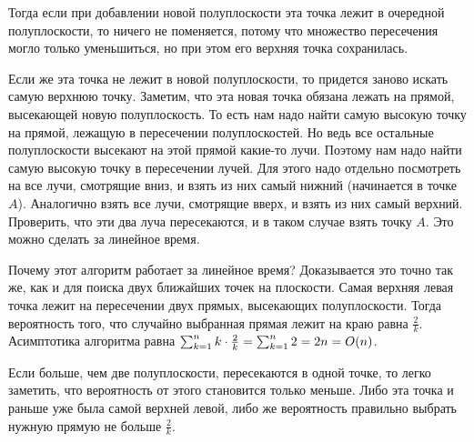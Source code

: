 Тогда если при добавлении новой полуплоскости эта точка лежит в очередной полуплоскости, то ничего не поменяется, потому что множество пересечения могло только уменьшиться, но при этом его верхняя точка сохранилась.

Если же эта точка не лежит в новой полуплоскости, то придется заново искать самую верхнюю точку. Заметим, что эта новая точка обязана лежать на прямой, высекающей новую полуплоскость. То есть нам надо найти самую высокую точку на прямой, лежащую в пересечении полуплоскостей. Но ведь все остальные полуплоскости высекают на этой прямой какие-то лучи. Поэтому нам надо найти самую высокую точку в пересечении лучей. Для этого надо отдельно посмотреть на все лучи, смотрящие вниз, и взять из них самый нижний (начинается в точке $A$). Аналогично взять все лучи, смотрящие вверх, и взять из них самый верхний. Проверить, что эти два луча пересекаются, и в таком случае взять точку $A$. Это можно сделать за линейное время.


Почему этот алгоритм работает за линейное время? Доказывается это точно так же, как и для поиска двух ближайших точек на плоскости. Самая верхняя левая точка лежит на пересечении двух прямых, высекающих полуплоскости. Тогда вероятность того, что случайно выбранная прямая лежит на краю равна $\frac{2}{k}$. Асимптотика алгоритма равна $\sum_{k = 1}^{n} k \cdot \frac{2}{k} = \sum_{k = 1}^{n} 2 = 2n = O(n)$.

\begin{observation}
    Если больше, чем две полуплоскости, пересекаются в одной точке, то легко заметить, что вероятность от этого становится только меньше. Либо эта точка и раньше уже была самой верхней левой, либо же вероятность правильно выбрать нужную прямую не больше $\frac{2}{k}$.
\end{observation}
